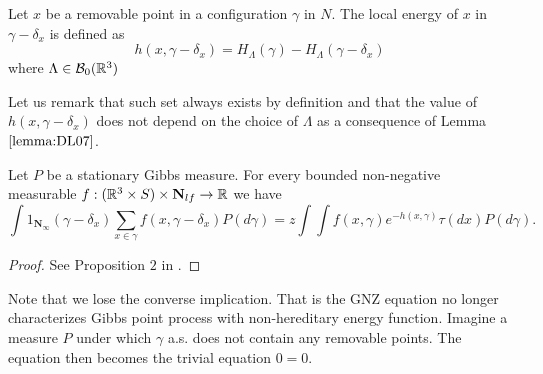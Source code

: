 \begin{definition}\label{def:localenergy}
	Let $x$ be a removable point in a configuration $\gamma$ in $N$. The local energy of $x$ in $\gamma - \delta_x$ is defined as
	$$h(x,\gamma - \delta_x) = H_\Lambda (\gamma) - H_\Lambda(\gamma - \delta_x)$$
	where $\Lambda \in \mathcal B_0({\mathbb R^3})$
\end{definition}
Let us remark that such set always exists by definition and that the value of $h(x,\gamma-\delta_x)$ does not depend on the choice of $\Lambda$ as a consequence of Lemma $\ref{lemma:DL07}$.


\begin{proposition}
	Let $P$ be a stationary Gibbs measure. For every bounded non-negative measurable $f:({\mathbb R^3}\times S) \times \mathbf N_{lf}\to\mathbb R$ we have
	$$\int 1_{\mathbf N_\infty}(\gamma-\delta_x) \sum_{x \in \gamma} f(x,\gamma -\delta_x) P(d\gamma) = z \int \int f(x,\gamma)e^{-h(x,\gamma)} \tau(dx) P(d\gamma).$$
\end{proposition}
\begin{proof}
	See Proposition $2$ in \cite{DereudreLavancier2009}.
\end{proof}

Note that we lose the converse implication. That is the GNZ equation no longer characterizes Gibbs point process with non-hereditary energy function. Imagine a measure $P$ under which $\gamma$ a.s. does not contain any removable points. The equation then becomes the trivial equation $0=0$.


